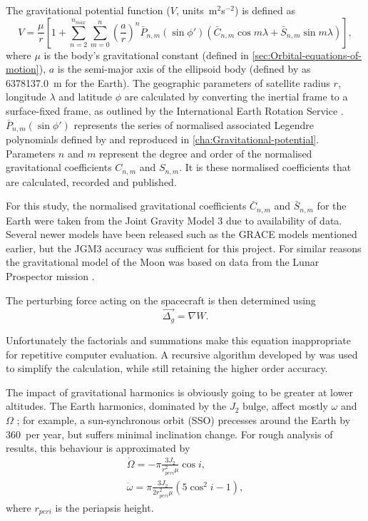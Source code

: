 The gravitational potential function ($V$, units~m$^{2}$s$^{-2}$) is defined as 
\begin{equation} \label{eq:Grav-Potential}
V=\frac{\mu}{r}\left[1+\sum_{n=2}^{n_{max}}\sum_{m=0}^{n}\left(\frac{a}{r}\right)^{n}\bar{P}_{n,m}(\sin\phi')(\bar{C}_{n,m}\cos m\lambda+\bar{S}_{n,m}\sin m\lambda)\right],
\end{equation}
where $\mu$ is the body's gravitational constant (defined in \autoref{sec:Orbital-equations-of-motion}), $a$ is the semi-major axis of the ellipsoid body (defined by \citeauthor{WGS84} as 6378137.0~m for the Earth). The geographic parameters of satellite radius $r$, longitude $\lambda$ and latitude $\phi$ are calculated by converting the inertial frame to a surface-fixed frame, as outlined by the International Earth Rotation Service \parencite{Petit2010}. $\bar{P}_{n,m}\left(\sin\phi'\right)$ represents the series of normalised associated Legendre polynomials defined by \textcite{WGS84} and reproduced in \autoref{cha:Gravitational-potential}. Parameters $n$ and $m$ represent the degree and order of the normalised gravitational coefficients $C_{n,m}$ and $S_{n,m}$. It is these normalised coefficients that are calculated, recorded and published. 

For this study, the normalised gravitational coefficients $\bar{C}_{n,m}$ and $\bar{S}_{n,m}$ for the Earth were taken from the Joint Gravity Model 3 \parencite[JGM3,][]{Tapley1996} due to availability of data. Several newer models have been released such as the GRACE models mentioned earlier, but the JGM3 accuracy was sufficient for this project. For similar reasons the gravitational model of the Moon was based on data from the Lunar Prospector mission \parencite[LP165, ][]{Konopliv2001}.

The perturbing force acting on the spacecraft is then determined using
\begin{equation}\label{eq:Oblateness-perturbation}
\vec{\Delta_g}=\nabla W.
\end{equation}

Unfortunately the factorials and summations make this equation inappropriate for repetitive computer evaluation. A recursive algorithm developed by \textcite{Montenbruck2000} was used to simplify the calculation, while still retaining the higher order accuracy. 

The impact of gravitational harmonics is obviously going to be greater at lower altitudes. The Earth harmonics, dominated by the $J_2$ bulge, affect mostly $\omega$ and $\Omega$ \parencite{Montenbruck2000,Eshagh2007}; for example, a sun-synchronous orbit (SSO) precesses around the Earth by 360\degrees\ per year, but suffers minimal inclination change. For rough analysis of results, this behaviour is approximated by
\begin{subequations}\label{eq:Precession}
\begin{gather}
\dot\Omega = -\pi\frac{3J_2}{r_{peri}^2\mu}\cos i, \\
\dot\omega = \pi\frac{3J_2}{2r_{peri}^2\mu}(5\cos^2i-1),
\end{gather}
\end{subequations}
where $r_{peri}$ is the periapsis height.



